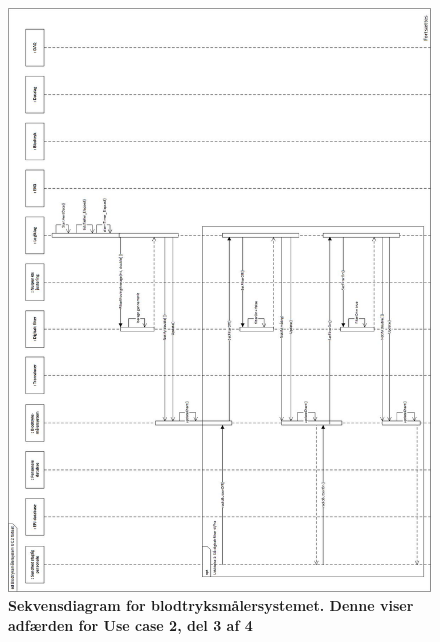 \begin{figure}[H]
\includegraphics[width =1.0\textwidth , center]{billeder/sdUC2_3}
\caption{\textbf{Sekvensdiagram for blodtryksmålersystemet. Denne viser adfærden for Use case 2, del 3 af 4}}
\end{figure}
